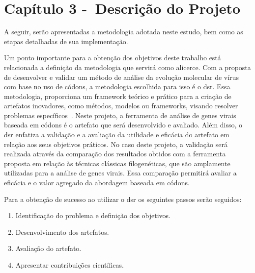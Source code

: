 
\chapter{Capítulo 3 -~Descrição do Projeto}






A seguir, serão apresentadas a metodologia adotada neste estudo, bem como as etapas detalhadas de sua implementação.

Um ponto importante para a obtenção dos objetivos deste trabalho está relacionada a definição da metodologia que servirá como alicerce. Com a proposta de desenvolver e validar um método de análise da evolução molecular de vírus com base no uso de códons, a metodologia escolhida para isso é o \gls{dsr}. Essa metodologia, proporciona um framework teórico e prático para a criação de artefatos inovadores, como métodos, modelos ou frameworks, visando resolver problemas específicos~\cite{peffers_dsr_2007}. Neste projeto, a ferramenta de análise de genes virais baseada em códons é o artefato que será desenvolvido e avaliado. Além disso, o \gls{dsr} enfatiza a validação e a avaliação da utilidade e eficácia do artefato em relação aos seus objetivos práticos. No caso deste projeto, a validação será realizada através da comparação dos resultados obtidos com a ferramenta proposta em relação às técnicas clássicas filogenéticas, que são amplamente utilizadas para a análise de genes virais. Essa comparação permitirá avaliar a eficácia e o valor agregado da abordagem baseada em códons.

Para a obtenção de sucesso ao utilizar o \gls{dsr} os seguintes passos serão seguidos:
\begin{enumerate}
  \item Identificação do problema e definição dos objetivos.
  \item Desenvolvimento dos artefatos.
  \item Avaliação do artefato.
  \item Apresentar contribuições científicas.
\end{enumerate}

